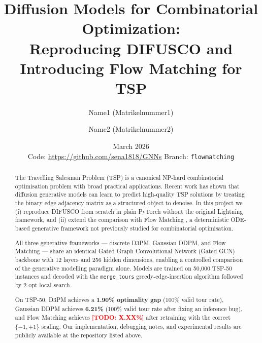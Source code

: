 \documentclass[11pt,a4paper]{article}
\title{\textbf{Diffusion Models for Combinatorial Optimization:}\\
       \textbf{Reproducing DIFUSCO and Introducing Flow Matching for TSP}}
\author{
  Name1 (Matrikelnummer1)
  \and
  Name2 (Matrikelnummer2)
}
\date{March 2026 \\[0.5em]
  \small Code: \url{https://github.com/sena1818/GNNs} \quad Branch: \texttt{flowmatching}
}
\newcommand{\TODO}[1]{\textcolor{red}{\textbf{[TODO: #1]}}}
\begin{document}
\maketitle

\begin{abstract}
%

The Travelling Salesman Problem (TSP) is a canonical NP-hard combinatorial optimisation
problem with broad practical applications. Recent work has shown that diffusion generative
models can learn to predict high-quality TSP solutions by treating the binary edge adjacency
matrix as a structured object to denoise. In this project we (i) reproduce DIFUSCO
\citep{sun2023difusco} from scratch in plain PyTorch without the original Lightning framework,
and (ii) extend the comparison with Flow Matching \citep{lipman2022flow}, a deterministic
ODE-based generative framework not previously studied for combinatorial optimisation.

All three generative frameworks — discrete D3PM, Gaussian DDPM, and Flow Matching — share an
identical Gated Graph Convolutional Network (Gated GCN) backbone with 12 layers and 256
hidden dimensions, enabling a controlled comparison of the generative modelling paradigm alone.
Models are trained on 50{,}000 TSP-50 instances and decoded with the \texttt{merge\_tours}
greedy-edge-insertion algorithm followed by 2-opt local search.

On TSP-50, D3PM achieves a \textbf{1.90\% optimality gap} (100\% valid tour rate),
Gaussian DDPM achieves \textbf{6.21\%} (100\% valid tour rate after fixing an inference bug),
and Flow Matching achieves \TODO{X.XX\%} after retraining with the correct \(\{-1,+1\}\)
scaling. Our implementation, debugging notes, and experimental results are publicly available
at the repository listed above.
\end{abstract}
\end{document}

